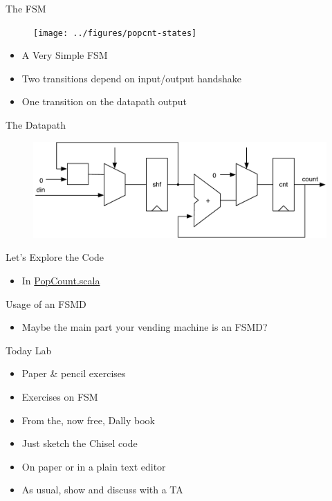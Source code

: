 \begin{frame}[fragile]{The FSM}
\begin{figure}
  \texttt{[image: ../figures/popcnt-states]}
\end{figure}
\begin{itemize}
\item A Very Simple FSM
\item Two transitions depend on input/output handshake
\item One transition on the datapath output
\end{itemize}
\end{frame}

\begin{frame}[fragile]{The Datapath}
\begin{figure}
  \includegraphics[scale=0.65]{../figures/popcnt-data}
\end{figure}
\end{frame}

\begin{frame}[fragile]{Let's Explore the Code}
\begin{itemize}
\item In \href{https://github.com/schoeberl/chisel-book/blob/master/src/main/scala/PopCount.scala}{PopCount.scala}
\end{itemize}
\end{frame}

\begin{frame}[fragile]{Usage of an FSMD}
\begin{itemize}
\item Maybe the main part your vending machine is an FSMD?
\end{itemize}
\end{frame}




\begin{frame}[fragile]{Today Lab}
\begin{itemize}
\item Paper \& pencil exercises
\item Exercises on FSM
\item From the, now free, Dally book
\item Just sketch the Chisel code
\item On paper or in a plain text editor
\item As usual, show and discuss with a TA
\end{itemize}
\end{frame}

